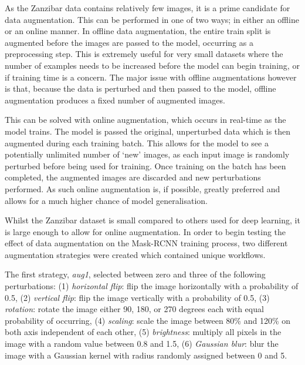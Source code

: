 As the Zanzibar data contains relatively few images, it is a prime candidate for data augmentation. This can be performed in one of two ways; in either an offline or an online manner. In offline data augmentation, the entire train split is augmented before the images are passed to the model, occurring as a preprocessing step. This is extremely useful for very small datasets where the number of examples needs to be increased before the model can begin training, or if training time is a concern. The major issue with offline augmentations however is that, because the data is perturbed and then passed to the model, offline augmentation produces a fixed number of augmented images. 

This can be solved with online augmentation, which occurs in real-time as the model trains. The model is passed the original, unperturbed data which is then augmented during each training batch. This allows for the model to see a potentially unlimited number of `new' images, as each input image is randomly perturbed before being used for training. Once training on the batch has been completed, the augmented images are discarded and new perturbations performed. As such online augmentation is, if possible, greatly preferred and allows for a much higher chance of model generalisation. 

Whilst the Zanzibar dataset is small compared to others used for deep learning, it is large enough to allow for online augmentation. In order to begin testing the effect of data augmentation on the Mask-RCNN training process, two different augmentation strategies were created which contained unique workflows. 

The first strategy, \textit{aug1}, selected between zero and three of the following perturbations: (1) \textit{horizontal flip}: flip the image horizontally with a probability of 0.5, (2) \textit{vertical flip}: flip the image vertically with a probability of 0.5, (3) \textit{rotation}: rotate the image either 90, 180, or 270 degrees each with equal probability of occurring, (4) \textit{scaling}: scale the image between 80\% and 120\% on both axis independent of each other, (5) \textit{brightness}: multiply all pixels in the image with a random value between 0.8 and 1.5, (6) \textit{Gaussian blur}: blur the image with a Gaussian kernel with radius randomly assigned between 0 and  5. 

